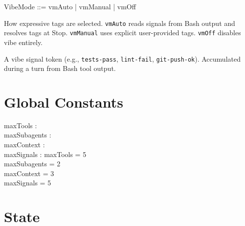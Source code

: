 \documentclass[a4paper,10pt,fleqn]{article}
\begin{document}
\begin{zed}
  VibeMode ::= vmAuto | vmManual | vmOff
\end{zed}

How expressive tags are selected. \texttt{vmAuto} reads signals from
Bash output and resolves tags at Stop. \texttt{vmManual} uses explicit
user-provided tags. \texttt{vmOff} disables vibe entirely.

\begin{zed}
  [SIGNAL]
\end{zed}

A vibe signal token (e.g., \texttt{tests-pass}, \texttt{lint-fail},
\texttt{git-push-ok}). Accumulated during a turn from Bash tool output.

\section{Global Constants}

\begin{axdef}
  maxTools : \nat \\
  maxSubagents : \nat \\
  maxContext : \nat \\
  maxSignals : \nat
  \where
  maxTools = 5 \\
  maxSubagents = 2 \\
  maxContext = 3 \\
  maxSignals = 5
\end{axdef}

\section{State}
\end{document}
